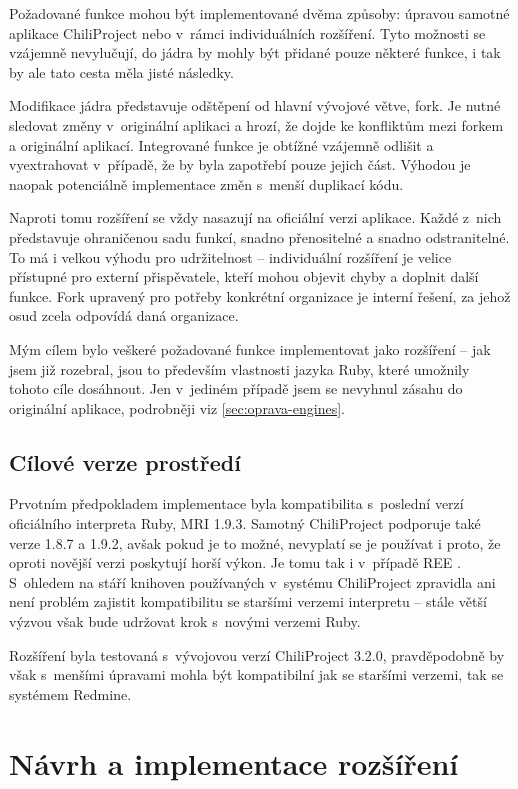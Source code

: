 \documentclass[thesis=B,czech]{FITthesis}[2012/05/02]
\begin{document}
Požadované funkce mohou být implementované dvěma způsoby: úpravou
samotné aplikace ChiliProject nebo v~rámci individuálních rozšíření.
Tyto možnosti se vzájemně nevylučují, do jádra by mohly být přidané
pouze některé funkce, i tak by ale tato cesta měla jisté následky.

Modifikace jádra představuje odštěpení od hlavní vývojové větve,
\gls{fork}. Je nutné sledovat změny v~originální aplikaci a hrozí, že
dojde ke konfliktům mezi forkem a originální aplikací. Integrované
funkce je obtížné vzájemně odlišit a vyextrahovat v~případě, že by byla
zapotřebí pouze jejich část. Výhodou je naopak potenciálně 
implementace změn s~menší duplikací kódu.

Naproti tomu rozšíření se vždy nasazují na oficiální verzi aplikace.
Každé z~nich představuje ohraničenou sadu funkcí, snadno přenositelné a
snadno odstranitelné. To má i velkou výhodu pro udržitelnost --
individuální rozšíření je velice přístupné pro externí přispěvatele,
kteří mohou objevit chyby a doplnit další funkce. Fork upravený pro
potřeby konkrétní organizace je interní řešení, za jehož osud zcela
odpovídá daná organizace.

Mým cílem bylo veškeré požadované funkce implementovat jako rozšíření --
jak jsem již rozebral, jsou to především vlastnosti jazyka Ruby, které
umožnily tohoto cíle dosáhnout. Jen v~jediném případě jsem se nevyhnul
zásahu do originální aplikace, podrobněji viz
\ref{sec:oprava-engines}.

\section{Cílové verze prostředí}

Prvotním předpokladem implementace byla kompatibilita s~poslední verzí
oficiálního interpreta Ruby, \gls{MRI} 1.9.3. Samotný ChiliProject
podporuje také verze 1.8.7 a 1.9.2, avšak pokud je to možné, nevyplatí se
je používat i proto, že oproti novější verzi poskytují horší výkon. Je tomu
tak i v~případě \gls{REE} \citep[End of Life]{REEEOL}. S~ohledem na stáří
knihoven používaných v~systému ChiliProject zpravidla ani není problém
zajistit kompatibilitu se staršími verzemi interpretu -- stále větší
výzvou však bude udržovat krok s~novými verzemi Ruby.

Rozšíření byla testovaná s~vývojovou verzí ChiliProject 3.2.0,
pravděpodobně by však s~menšími úpravami mohla být kompatibilní jak se
staršími verzemi, tak se systémem Redmine.

\chapter{Návrh a implementace rozšíření}
\end{document}
